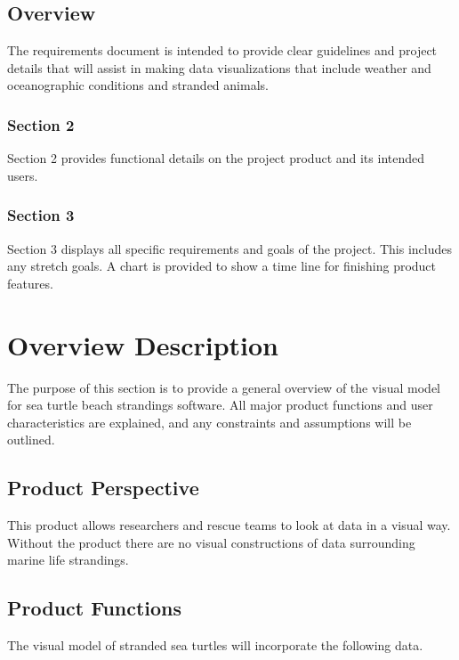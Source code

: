 \documentclass[onecolumn, draftclsnofoot,10pt, compsoc]{IEEEtran}
\begin{document}
\begin{singlespace}
\subsection{Overview}
    The requirements document is intended to provide clear guidelines and project details that will assist in making data visualizations that include weather and oceanographic conditions and stranded animals.
    
    \subsubsection{Section 2}
    Section 2 provides functional details on the project product and its intended users.
    
    \subsubsection{Section 3}
    Section 3 displays all specific requirements and goals of the project.  This includes any stretch goals. A chart is provided to show a time line for finishing product features.
\section{Overview Description}
The purpose of this section is to provide a general overview of the visual model for sea turtle beach strandings software. All major product functions and user characteristics are explained, and any constraints and assumptions will be outlined.
\subsection{Product Perspective}
This product allows researchers and rescue teams to look at data in a visual way. Without the product there are no visual constructions of data surrounding marine life strandings.
\subsection{Product Functions}
The visual model of stranded sea turtles will incorporate the following data.

\end{singlespace}
\end{document}
